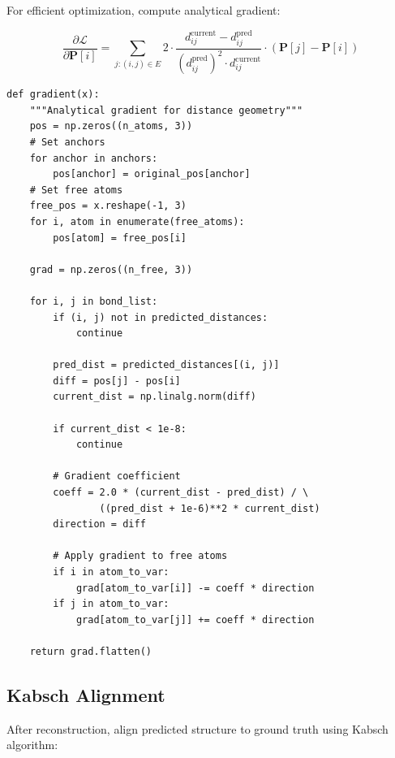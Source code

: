 \documentclass[11pt,a4paper]{article}
\begin{document}
For efficient optimization, compute analytical gradient:

\begin{equation}
\frac{\partial \mathcal{L}}{\partial \mathbf{P}[i]} = \sum_{j : (i,j) \in E} 2 \cdot \frac{d_{ij}^{\text{current}} - d_{ij}^{\text{pred}}}{(d_{ij}^{\text{pred}})^2 \cdot d_{ij}^{\text{current}}} \cdot (\mathbf{P}[j] - \mathbf{P}[i])
\end{equation}

\begin{lstlisting}[caption={Gradient Computation (lines 493-525)}]
def gradient(x):
    """Analytical gradient for distance geometry"""
    pos = np.zeros((n_atoms, 3))
    # Set anchors
    for anchor in anchors:
        pos[anchor] = original_pos[anchor]
    # Set free atoms
    free_pos = x.reshape(-1, 3)
    for i, atom in enumerate(free_atoms):
        pos[atom] = free_pos[i]

    grad = np.zeros((n_free, 3))

    for i, j in bond_list:
        if (i, j) not in predicted_distances:
            continue

        pred_dist = predicted_distances[(i, j)]
        diff = pos[j] - pos[i]
        current_dist = np.linalg.norm(diff)

        if current_dist < 1e-8:
            continue

        # Gradient coefficient
        coeff = 2.0 * (current_dist - pred_dist) / \
                ((pred_dist + 1e-6)**2 * current_dist)
        direction = diff

        # Apply gradient to free atoms
        if i in atom_to_var:
            grad[atom_to_var[i]] -= coeff * direction
        if j in atom_to_var:
            grad[atom_to_var[j]] += coeff * direction

    return grad.flatten()
\end{lstlisting}

\subsection{Kabsch Alignment}

After reconstruction, align predicted structure to ground truth using Kabsch algorithm:
\end{document}
